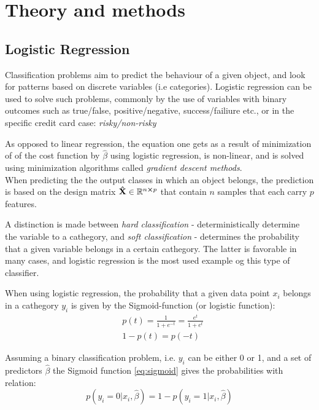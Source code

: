 \section{Theory and methods}
\label{sec:theory}

\subsection{Logistic Regression}
Classification problems aim to predict the behaviour of a given object, and look for patterns based on discrete variables (i.e categories). Logistic regression can be used to solve such problems, commonly by the use of variables with binary outcomes such as true/false, positive/negative, success/failiure etc., or in the specific credit card case: \textit{risky/non-risky} \cite{LogRegLectures}

As opposed to linear regression, the equation one gets as a result of minimization of of the cost function by $\hat{\beta}$ using logistic regression, is non-linear, and is solved using minimization algorithms called \emph{gradient descent methods}. \\

When predicting the the output classes in which an object belongs, the prediction is based on the design matrix $\mathbf{\hat{X}} \in \mathbb{R}^{n\cross p}$ that contain $n$ samples that each carry $p$ features.

A distinction is made between \textit{hard classification} - deterministically determine the variable to a cathegory, and \textit{soft classification} - determines the probability that a given variable belongs in a certain cathegory. The latter is favorable in many cases, and logistic regression is the most used example og this type of classifier.

When using logistic regression, the probability that a given data point $x_i$ belongs in a cathegory $y_i$ is given by the Sigmoid-function (or logistic function):
\begin{equation}
\begin{split}
    & p(t) = \frac{1}{1 + e^{-t}} = \frac{e^t}{1+e^t} \\
    & 1-p(t) = p(-t)
\end{split}
  \label{eq:sigmoid}
\end{equation}

Assuming a binary classification problem, i.e. $y_i$ can be either 0 or 1, and a set of predictors $\hat{\beta}$ the Sigmoid function \eqref{eq:sigmoid} gives the probabilities with relation:
\begin{equation*}
  p(y_i = 0|x_i,\hat{\beta})  = 1 - p(y_i = 1|x_i,\hat{\beta})
  \label{eq:prob_relation}
\end{equation*}

